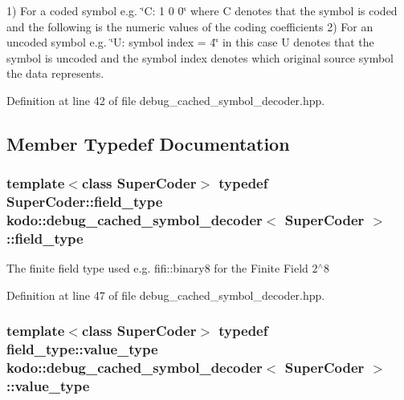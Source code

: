 1) For a coded symbol e.\-g. \char`\"{}\-C\-: 1 0 0\char`\"{} where C denotes that the symbol is coded and the following is the numeric values of the coding coefficients 2) For an uncoded symbol e.\-g. \char`\"{}\-U\-: symbol index = 4\char`\"{} in this case U denotes that the symbol is uncoded and the symbol index denotes which original source symbol the data represents. 

Definition at line 42 of file debug\-\_\-cached\-\_\-symbol\-\_\-decoder.\-hpp.



\subsection{Member Typedef Documentation}
\hypertarget{classkodo_1_1debug__cached__symbol__decoder_aa3d3e96340faae6d4d4f09d5cddea6ff}{
\subsubsection[{field\-\_\-type}]{\setlength{\rightskip}{0pt plus 5cm}template$<$class Super\-Coder$>$ typedef Super\-Coder\-::field\-\_\-type {\bf kodo\-::debug\-\_\-cached\-\_\-symbol\-\_\-decoder}$<$ Super\-Coder $>$\-::{\bf field\-\_\-type}}}\label{classkodo_1_1debug__cached__symbol__decoder_aa3d3e96340faae6d4d4f09d5cddea6ff}




The finite field type used e.\-g. fifi\-::binary8 for the Finite Field 2$^\wedge$8 

Definition at line 47 of file debug\-\_\-cached\-\_\-symbol\-\_\-decoder.\-hpp.

\hypertarget{classkodo_1_1debug__cached__symbol__decoder_ab5575893daee52bc132f9853ff3e229f}{
\subsubsection[{value\-\_\-type}]{\setlength{\rightskip}{0pt plus 5cm}template$<$class Super\-Coder$>$ typedef field\-\_\-type\-::value\-\_\-type {\bf kodo\-::debug\-\_\-cached\-\_\-symbol\-\_\-decoder}$<$ Super\-Coder $>$\-::{\bf value\-\_\-type}}}\label{classkodo_1_1debug__cached__symbol__decoder_ab5575893daee52bc132f9853ff3e229f}




